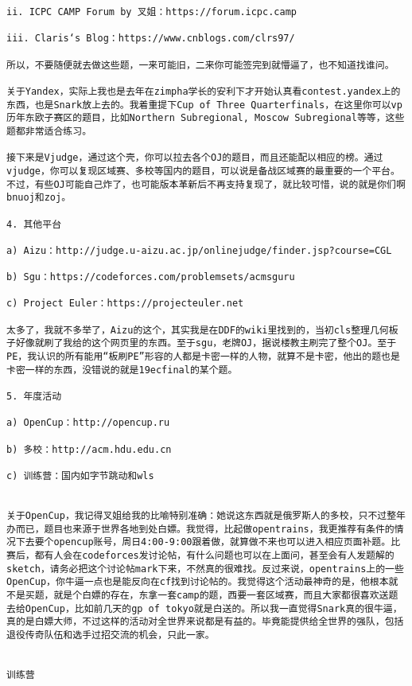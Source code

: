 \documentclass[UTF8]{../computerUniverse}
\begin{document}
\begin{lstlisting}
ii. ICPC CAMP Forum by 叉姐：https://forum.icpc.camp

iii. Claris‘s Blog：https://www.cnblogs.com/clrs97/

所以，不要随便就去做这些题，一来可能旧，二来你可能签完到就懵逼了，也不知道找谁问。

关于Yandex，实际上我也是去年在zimpha学长的安利下才开始认真看contest.yandex上的东西，也是Snark放上去的。我着重提下Cup of Three Quarterfinals，在这里你可以vp历年东欧子赛区的题目，比如Northern Subregional, Moscow Subregional等等，这些题都非常适合练习。

接下来是Vjudge，通过这个壳，你可以拉去各个OJ的题目，而且还能配以相应的榜。通过vjudge，你可以复现区域赛、多校等国内的题目，可以说是备战区域赛的最重要的一个平台。不过，有些OJ可能自己炸了，也可能版本革新后不再支持复现了，就比较可惜，说的就是你们啊bnuoj和zoj。

4. 其他平台

a) Aizu：http://judge.u-aizu.ac.jp/onlinejudge/finder.jsp?course=CGL

b) Sgu：https://codeforces.com/problemsets/acmsguru

c) Project Euler：https://projecteuler.net

太多了，我就不多举了，Aizu的这个，其实我是在DDF的wiki里找到的，当初cls整理几何板子好像就刷了我给的这个网页里的东西。至于sgu，老牌OJ，据说楼教主刷完了整个OJ。至于PE，我认识的所有能用“板刷PE”形容的人都是卡密一样的人物，就算不是卡密，他出的题也是卡密一样的东西，没错说的就是19ecfinal的某个题。

5. 年度活动

a) OpenCup：http://opencup.ru

b) 多校：http://acm.hdu.edu.cn

c) 训练营：国内如字节跳动和wls


关于OpenCup，我记得叉姐给我的比喻特别准确：她说这东西就是俄罗斯人的多校，只不过整年办而已，题目也来源于世界各地到处白嫖。我觉得，比起做opentrains，我更推荐有条件的情况下去要个opencup账号，周日4:00-9:00跟着做，就算做不来也可以进入相应页面补题。比赛后，都有人会在codeforces发讨论帖，有什么问题也可以在上面问，甚至会有人发题解的sketch，请务必把这个讨论帖mark下来，不然真的很难找。反过来说，opentrains上的一些OpenCup，你牛逼一点也是能反向在cf找到讨论帖的。我觉得这个活动最神奇的是，他根本就不是买题，就是个白嫖的存在，东拿一套camp的题，西要一套区域赛，而且大家都很喜欢送题去给OpenCup，比如前几天的gp of tokyo就是白送的。所以我一直觉得Snark真的很牛逼，真的是白嫖大师，不过这样的活动对全世界来说都是有益的。毕竟能提供给全世界的强队，包括退役传奇队伍和选手过招交流的机会，只此一家。


训练营

\end{lstlisting}
\end{document}
